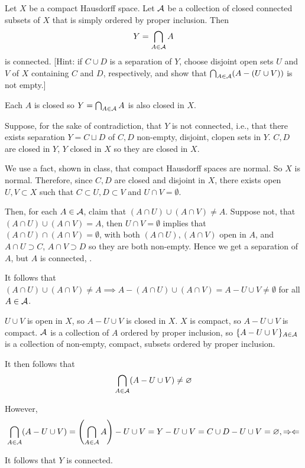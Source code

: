\documentclass[a4paper, 12pt]{article}
\begin{document}
\begin{problem} 
Let $X$ be a compact Hausdorff space. Let $\mathcal{A}$ be a collection of closed connected subsets of $X$ that is simply ordered by proper inclusion. Then \begin{equation*}
Y = \bigcap_{A \in \mathcal{A}} A
\end{equation*}
is connected. [Hint: if $C \cup D$ is a separation of $Y$, choose disjoint open sets $U$ and $V$ of $X$ containing $C$ and $D$, respectively, and show that $\bigcap_{A \in \mathcal{A}}(A - (U \cup V))$ is not empty.]
\end{problem}
\begin{solution}
    Each $A$ is closed so $Y = \bigcap_{A \in \mathcal{A}} A$ is also closed in $X$.

    Suppose, for the sake of contradiction, that $Y$ is not connected, i.e., that there exists separation $Y = C \sqcup D$ of $C, D$ non-empty, disjoint, clopen sets in $Y$. $C, D$ are closed in $Y$, $Y$ closed in $X$ so they are closed in $X$.

    We use a fact, shown in class, that compact Hausdorff spaces are normal. So $X$ is normal. Therefore, since $C, D$ are closed and disjoint in $X$, there exists open $U, V \subset X$  such that $C \subset U, D \subset V$ and $U \cap V = \emptyset$.

    Then, for each $A \in \mathcal{A}$, claim that $(A \cap U) \cup (A \cap V) \neq A$. Suppose not, that $(A \cap U) \cup (A \cap V) = A$, then $U \cap V = \emptyset$ implies that $(A \cap U) \cap (A \cap V) = \emptyset$, with both $(A \cap U), (A \cap V)$ open in $A$, and $A \cap U \supset C$, $A \cap V \supset D$ so they are both non-empty. Hence we get a separation of $A$, but $A$ is connected, \contra.

    It follows that $(A \cap U) \cup (A \cap V) \neq A \implies A - (A\cap U) \cup (A \cap V) = A - U \cup V \neq \emptyset$ for all $A \in \mathcal{A}$.

    $U \cup V$ is open in $X$, so $A - U \cup V$ is closed in $X$. $X$ is compact, so $A - U \cup V$ is compact. $\mathcal{A}$ is a collection of $A$ ordered by proper inclusion, so $\{A - U\cup V\}_{A \in \mathcal{A}} $ is a collection of non-empty, compact, subsets ordered by proper inclusion.

    It then follows that \begin{equation*}
    \bigcap_{A \in \mathcal{A}} (A - U\cup V) \neq \varnothing
    \end{equation*}

    However, \begin{equation*}
        \bigcap_{A \in \mathcal{A}} (A - U\cup V) = \left(\bigcap_{A \in \mathcal{A}} A\right) - U \cup V = Y - U \cup V = C \cup D - U \cup V = \varnothing, \Rightarrow\Leftarrow
    \end{equation*}

    It follows that $Y$ is connected.
\end{solution}
\end{document}

